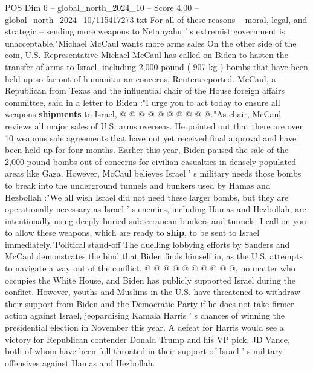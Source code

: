 \begin{textsample}{POS Dim 6 – global\_north\_2024\_10 – Score 4.00 – global\_north\_2024\_10/115417273.txt}
For all of these reasons -- moral, legal, and strategic -- sending more weapons to Netanyahu ' s extremist government is unacceptable."Michael McCaul wants more arms sales On the other side of the coin, U.S.
Representative Michael McCaul has called on Biden to hasten the transfer of arms to Israel, including 2,000-pound ( 907-kg ) bombs that have been held up so far out of humanitarian concerns, Reutersreported.
McCaul, a Republican from Texas and the influential chair of the House foreign affairs committee, said in a letter to Biden :"I urge you to act today to ensure all weapons \textbf{shipments} to Israel, @ @ @ @ @ @ @ @ @ @."As chair, McCaul reviews all major sales of U.S. arms overseas.
He pointed out that there are over 10 weapons sale agreements that have not yet received final approval and have been held up for four months.
Earlier this year, Biden paused the sale of the 2,000-pound bombs out of concerns for civilian casualties in densely-populated areas like Gaza.
However, McCaul believes Israel ' s military needs those bombs to break into the underground tunnels and bunkers used by Hamas and Hezbollah :"We all wish Israel did not need these larger bombs, but they are operationally necessary as Israel ' s enemies, including Hamas and Hezbollah, are intentionally using deeply buried subterranean bunkers and tunnels.
I call on you to allow these weapons, which are ready to \textbf{ship}, to be sent to Israel immediately."Political stand-off The duelling lobbying efforts by Sanders and McCaul demonstrates the bind that Biden finds himself in, as the U.S. attempts to navigate a way out of the conflict. @ @ @ @ @ @ @ @ @ @, no matter who occupies the White House, and Biden has publicly supported Israel during the conflict.
However, youths and Muslims in the U.S. have threatened to withdraw their support from Biden and the Democratic Party if he does not take firmer action against Israel, jeopardising Kamala Harris ' s chances of winning the presidential election in November this year.
A defeat for Harris would see a victory for Republican contender Donald Trump and his VP pick, JD Vance, both of whom have been full-throated in their support of Israel ' s military offensives against Hamas and Hezbollah.

\end{textsample}
